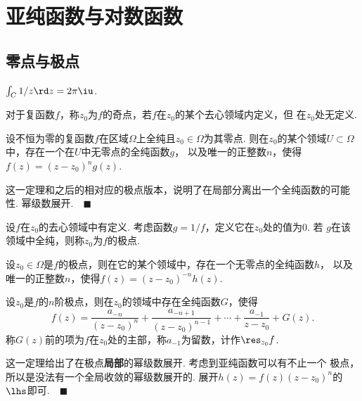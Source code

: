 \section{亚纯函数与对数函数}

\subsection{零点与极点}

  \begin{pos}
    $\int_C 1/z \rd z = 2\pi\iu$.
  \end{pos}

  \begin{defi}[奇点]
    对于复函数$f$，称$z_0$为$f$的奇点，若$f$在$z_0$的某个去心领域内定义，但
    在$z_0$处无定义.
  \end{defi}

  \begin{thm}
    \label{thm: 零点、分离}
    设不恒为零的复函数$f$在区域$\Omega$上全纯且$z_0\in\Omega$为其零点.
    则在$z_0$的某个领域$U\subset\Omega$中，存在一个在$U$中无零点的全纯函数$g$，
    以及唯一的正整数$n$，使得$f(z)=(z-z_0)^ng(z)$.
  \end{thm}
  \remark
    这一定理和之后的相对应的极点版本，说明了在局部分离出一个全纯函数的可能性.
  \proof
    幂级数展开.$\quad\blacksquare$

  \begin{defi}[极点]
    设$f$在$z_0$的去心领域中有定义. 考虑函数$g=1/f$，定义它在$z_0$处的值为$0$. 若
    $g$在该领域中全纯，则称$z_0$为$f$的极点.
  \end{defi}

  \begin{thm}
    设$z_0\in\Omega$是$f$的极点，则在它的某个领域中，存在一个无零点的全纯函数$h$，
    以及唯一的正整数$n$，使得$f(z)=(z-z_0)^{-n}h(z)$.
  \end{thm}

  \begin{thm}
    \label{thm: 极点展开}
    设$z_0$是$f$的$n$阶极点，则在$z_0$的领域中存在全纯函数$G$，使得
    \[
      f(z) = \frac{a_{-n}}{(z-z_0)^n} + \frac{a_{-n+1}}{(z-z_0)^{n-1}} + \cdots +
      \frac{a_{-1}}{z-z_0} + G(z).
    \]
    称$G(z)$前的项为$f$在$z_0$处的主部，称$a_{-1}$为留数，计作$\res_{z_0}f$.
  \end{thm}
  \remark
    这一定理给出了在极点\textbf{局部}的幂级数展开. 考虑到亚纯函数可以有不止一个
    极点，所以是没法有一个全局收敛的幂级数展开的. 
  \proof
    展开$h(z)=f(z)(z-z_0)^n$的$\lhs$即可.$\quad\blacksquare$

